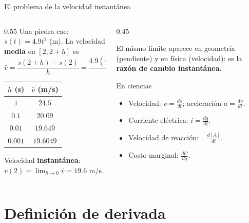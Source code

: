 \documentclass[10pt,aspectratio=169]{beamer}
\begin{document}
\begin{frame}{El problema de la velocidad instantánea}
  \begin{columns}
    \begin{column}{0.55\textwidth}
      Una piedra cae: $s(t)=4.9t^2$ (m). La velocidad \textbf{media} en $[2,2+h]$ es
      \[ \bar v=\frac{s(2+h)-s(2)}{h}=\frac{4.9(4h+h^2)}{h}=19.6+4.9h. \]
      \begin{center}
        \small
        \begin{tabular}{c|c}
          $h$ (s) & $\bar v$ (m/s)\\ \hline
          $1$ & $24.5$\\
          $0.1$ & $20.09$\\
          $0.01$ & $19.649$\\
          $0.001$ & $19.6049$
        \end{tabular}
      \end{center}
      Velocidad \textbf{instantánea}: $v(2)=\lim_{h\to0}\bar v=19.6$ m/s.
    \end{column}
    \begin{column}{0.45\textwidth}
      \begin{idea}
        El mismo límite aparece en geometría (pendiente) y en física (velocidad): es la \textbf{razón de cambio instantánea}.
      \end{idea}
      \begin{block}{En ciencias}
        \begin{itemize}
          \item Velocidad: $v=\frac{ds}{dt}$; aceleración $a=\frac{dv}{dt}$.
          \item Corriente eléctrica: $i=\frac{dq}{dt}$.
          \item Velocidad de reacción: $-\frac{d[A]}{dt}$.
          \item Costo marginal: $\frac{dC}{dq}$.
        \end{itemize}
      \end{block}
    \end{column}
  \end{columns}
\end{frame}

\section{Definición de derivada}
\end{document}
